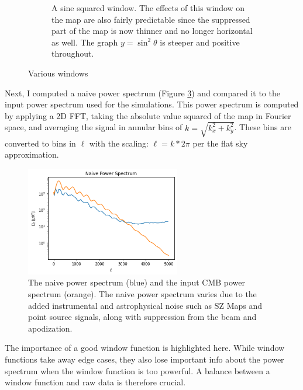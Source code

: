 \documentclass[12pt]{article}
\begin{document}
\begin{figure}[H]
\begin{subfigure}[t]{0.49\textwidth}
         \caption{A sine squared window. The effects of this window on the map are also fairly predictable since the suppressed part of the map is now thinner and no longer horizontal as well. The graph $y=\sin^2\theta$ is steeper and positive throughout.}
         \label{fig:sine_squared_window}
     \end{subfigure}
        \caption{Various windows}
        \label{fig:my_label}
\end{figure}

Next, I computed a naive power spectrum (Figure \ref{fig:naive}) and compared it to the input power spectrum used for the simulations. This power spectrum is computed by applying a 2D FFT, taking the absolute value squared of the map in Fourier space, and averaging the signal in annular bins of $k = \sqrt{k_x^2 + k_y^2}$.  These bins are converted to bins in $\ell$ with the scaling: $\ell = k* 2 \pi$ per the flat sky approximation.

\begin{figure}[H]
    \centering
    \includegraphics[width=0.6\textwidth]{images/Naive Power Spectrum.png}
    \caption{The naive power spectrum (blue) and the input CMB power spectrum (orange). The naive power spectrum varies due to the added instrumental and astrophysical noise such as SZ Maps and point source signals, along with suppression from the beam and apodization.}
    \label{fig:naive}
\end{figure}

The importance of a good window function is highlighted here. While window functions take away edge cases, they also lose important info about the power spectrum when the window function is too powerful. A balance between a window function and raw data is therefore crucial.
\end{document}
